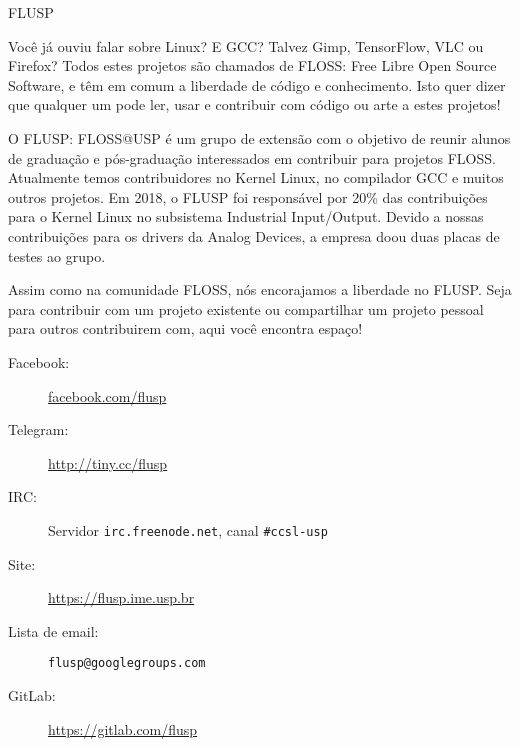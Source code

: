 \begin{subsecao}{FLUSP}


Você já ouviu falar sobre Linux? E GCC? Talvez Gimp, TensorFlow, VLC ou Firefox?
Todos estes projetos são chamados de FLOSS: Free Libre Open Source Software, e
têm em comum a liberdade de código e conhecimento. Isto quer dizer que qualquer
um pode ler, usar e contribuir com código ou arte a estes projetos!

O FLUSP: FLOSS@USP é um grupo de extensão com o objetivo de reunir alunos de
graduação e pós-graduação interessados em contribuir para projetos FLOSS.
Atualmente temos contribuidores no Kernel Linux, no compilador GCC e muitos
outros projetos. Em 2018, o FLUSP foi responsável por 20\% das contribuições
para o Kernel Linux no subsistema Industrial Input/Output. Devido a nossas
contribuições para os drivers da Analog Devices, a empresa doou duas placas
de testes ao grupo.

Assim como na comunidade FLOSS, nós encorajamos a liberdade no FLUSP. Seja para
contribuir com um projeto existente ou compartilhar um projeto pessoal para
outros contribuirem com, aqui você encontra espaço!

\begin{description}
  \item[Facebook:] \url{facebook.com/flusp}
  \item[Telegram:] \url{http://tiny.cc/flusp}
  \item[IRC:] Servidor \texttt{irc.freenode.net}, canal \texttt{\#ccsl-usp}
  \item[Site:] \url{https://flusp.ime.usp.br}
  \item[Lista de email:] \texttt{flusp@googlegroups.com}
  \item[GitLab:] \url{https://gitlab.com/flusp}
\end{description}

\end{subsecao}
